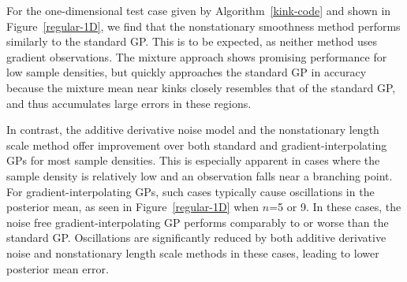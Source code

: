 \documentclass{article}
\numberwithin{equation}{section}
\begin{document}
For the one-dimensional test case given by Algorithm~\ref{kink-code} and shown in Figure~\ref{regular-1D}, we find that the nonstationary smoothness method performs similarly to the standard GP. This is to be expected, as neither method uses gradient observations. The mixture approach shows promising performance for low sample densities, but quickly approaches the standard GP in accuracy because the mixture mean near kinks closely resembles that of the standard GP, and thus accumulates large errors in these regions.

In contrast, the additive derivative noise model and the nonstationary length scale method offer improvement over both standard and gradient-interpolating GPs for most sample densities. This is especially apparent in cases where the sample density is relatively low and an observation falls near a branching point. For gradient-interpolating GPs, such cases typically cause oscillations in the posterior mean, as seen in Figure~\ref{regular-1D} when $n$=5 or 9. In these cases, the noise free gradient-interpolating GP performs comparably to or worse than the standard GP. Oscillations are significantly reduced by both additive derivative noise and nonstationary length scale methods in these cases, leading to lower posterior mean error.
\end{document}
